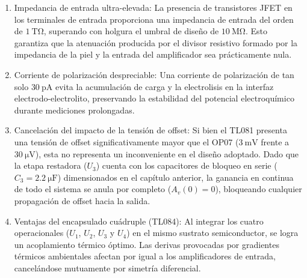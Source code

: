 \begin{enumerate}
  \item Impedancia de entrada ultra-elevada: La presencia de transistores JFET en los terminales de entrada proporciona
  una impedancia de entrada del orden de $\SI{1}{\tera\ohm}$, superando con holgura el umbral de diseño de
  $\SI{10}{\mega\ohm}$. Esto garantiza que la atenuación producida por el divisor resistivo formado por la impedancia
  de la piel y la entrada del amplificador sea prácticamente nula.
  \item Corriente de polarización despreciable: Una corriente de polarización de tan solo $\SI{30}{\pico\ampere}$
  evita la acumulación de carga y la electrolisis en la interfaz electrodo-electrolito, preservando la estabilidad del
  potencial electroquímico durante mediciones prolongadas.
  \item Cancelación del impacto de la tensión de offset: Si bien el TL081 presenta una tensión de offset significativamente
  mayor que el OP07 ($\SI{3}{\milli\volt}$ frente a $\SI{30}{\micro\volt}$), esta no representa un inconveniente en el
  diseño adoptado. Dado que la etapa restadora ($U_3$) cuenta con los capacitores de bloqueo en serie ($C_3 = \SI{2.2}{\micro\farad}$) dimensionados en el capítulo anterior, la ganancia en continua de todo el sistema se anula por completo ($A_{v}(0) = 0$), bloqueando cualquier propagación de offset hacia la salida.
  \item Ventajas del encapsulado cuádruple (TL084): Al integrar los cuatro operacionales ($U_1$, $U_2$, $U_3$ y $U_4$) en
  el mismo sustrato semiconductor, se logra un acoplamiento térmico óptimo. Las derivas provocadas por gradientes térmicos
  ambientales afectan por igual a los amplificadores de entrada, cancelándose mutuamente por simetría diferencial.
\end{enumerate}

